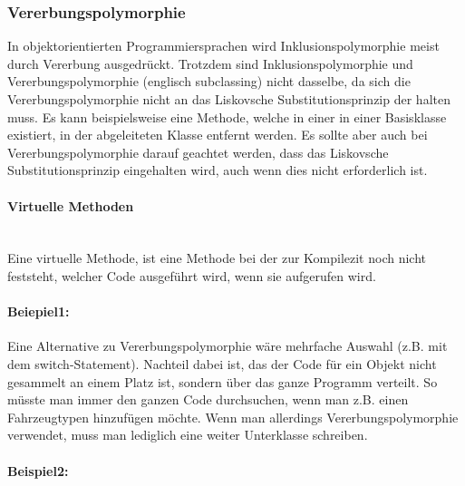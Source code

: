 		\subsubsection{Vererbungspolymorphie}
			In objektorientierten Programmiersprachen wird Inklusionspolymorphie meist durch Vererbung ausgedrückt.
			Trotzdem sind Inklusionspolymorphie und Vererbungspolymorphie (englisch subclassing) nicht dasselbe, da sich
			die Vererbungspolymorphie nicht an das Liskovsche Substitutionsprinzip der halten muss. Es kann beispielsweise
			eine Methode, welche in einer in einer Basisklasse existiert, in der abgeleiteten Klasse entfernt werden. Es
			sollte aber auch bei Vererbungspolymorphie darauf geachtet werden, dass das Liskovsche Substitutionsprinzip
			eingehalten wird, auch wenn dies nicht erforderlich ist.
			
			\paragraph{Virtuelle Methoden}\mbox{}\\
				Eine virtuelle Methode, ist eine Methode bei der zur Kompilezit noch nicht feststeht, welcher Code ausgeführt
				wird, wenn sie aufgerufen wird.
			
			\paragraph*{Beiepiel1:}\mbox{}
			
				\UseRawInputEncoding{}
				Eine Alternative zu Vererbungspolymorphie wäre mehrfache Auswahl (z.B. mit dem switch-Statement). Nachteil dabei
				ist, das der Code für ein Objekt nicht gesammelt an einem Platz ist, sondern über das ganze Programm verteilt.
				So müsste man immer den ganzen Code durchsuchen, wenn man z.B. einen Fahrzeugtypen hinzufügen möchte. Wenn man
				allerdings Vererbungspolymorphie verwendet, muss man lediglich eine weiter Unterklasse schreiben.
				
				\UseRawInputEncoding{}
				
			
			\paragraph*{Beispiel2:}\mbox{}
			
